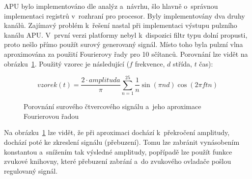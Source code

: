 APU bylo implementováno dle analýz a~návrhu, šlo hlavně o~správnou implementaci registrů v~rozhraní pro procesor. Byly implementovány dva druhy kanálů. Zajímavý problém k~řešení nastal při implementaci výstupu pulzního kanálu APU. V~první verzi platformy nebyl k~dispozici filtr typu dolní propusti, proto nešlo přímo použít surový generovaný signál. Místo toho byla pulzní vlna aproximována za použití Fourierovy řady pro 10 sčítanců. Porovnání lze vidět na obrázku~\ref{fig:impl-fourier}. Použitý vzorec je následující ($f$ frekvence, $d$ střída, $t$ čas):

\[
vzorek(t) = \frac{2 \cdot amplituda}{\pi}\sum_{n = 1}^{25}{\frac{1}{n}\sin(\pi n d)\cos(2 \pi f t n)}
\]

\begin{figure}[ht!]
	\centering
	\caption{Porovnání surového čtvercového signálu a~jeho aproximace Fourierovou řadou}\label{fig:impl-fourier}
\end{figure}

\begin{note}
	Na obrázku~\ref{fig:impl-fourier} lze vidět, že při aproximaci dochází k~překročení amplitudy, dochází poté ke zkreslení signálu (přebuzení). Tomu lze zabránit vynásobením konstantou a~snížením tak výsledné amplitudy, popřípadě lze použít funkce zvukové knihovny, které přebuzení zabrání a~do zvukového ovladače pošlou regulovaný signál.
\end{note}

